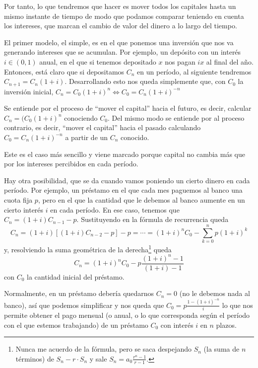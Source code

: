 \documentclass[nochap,palatino,shortheader]{apuntes}
\newcommand{\study}[1]{#1} \newcommand{\substudy}[1]{#1}
\begin{document}
Por tanto, lo que tendremos que hacer es mover todos los capitales hasta un mismo instante de tiempo de modo que podamos comparar teniendo en cuenta los intereses, que marcan el cambio de valor del dinero a lo largo del tiempo.

El primer modelo, el simple, es en el que ponemos una inversión que nos va generando intereses que se acumulan. Por ejemplo, un depósito con un interés $i ∈ (0,1)$ anual, en el que si tenemos depositado $x$ nos pagan $ix$ al final del año. Entonces, está claro que si depositamos $C_n$ en un período, al siguiente tendremos $C_{n+1} = C_n(1+i)$. Desarrollando esto nos queda simplemente que, con $C_0$ la inversión inicial, \( C_n = C_0 (1+i)^n \iff C_0 = C_n (1+i)^{-n} \label{eq:InteresCapFijo} \)

Se entiende por  el proceso de ``\study{mover el capital}'' hacia el futuro, es decir, calcular $C_n=(C_0(1+i)^n$ conociendo $C_0$. Del mismo modo se entiende por  al proceso contrario, es decir, ``mover el capital'' hacia el pasado calculando $C_0=C_n(1+i)^{-n}$ a partir de un $C_n$ conocido.

Este es el caso más sencillo y viene marcado porque capital no cambia más que por los intereses percibidos en cada período.

Hay otra posibilidad, que se da cuando vamos poniendo un cierto dinero en cada período. Por ejemplo, un préstamo en el que cada mes paguemos al banco una cuota fija $p$, pero en el que la cantidad que le debemos al banco aumente en un cierto interés $i$ en cada período. En ese caso, tenemos que $C_n = (1 + i) C_{n-1} - p$. Sustituyendo en la fórmula de recurrencia queda \[ C_n = (1 + i) \left[ (1+i) C_{n-2} - p\right] - p = \dotsb = (1+i)^nC_0 - \sum_{k = 0}^{n} p (1 + i)^k \] y, resolviendo la suma geométrica de la derecha\footnote{Nunca me acuerdo de la fórmula, pero se saca despejando $S_n$ (la suma de $n$ términos) de $S_n - r·S_n$ y sale $S_n = a_0 \frac{r^n - 1}{r-1}$.} queda \[ C_n = (1+i)^nC_0 - p\frac{(1+i)^{n} - 1}{(1+i) - 1}  \] con $C_0$ la cantidad inicial del préstamo.

Normalmente, en un préstamo debería quedarnos $C_n = 0$ (no le debemos nada al banco), así que podemos simplificar y nos queda que \( C_0 = p \frac{1 - (1 + i)^{-n}}{i} \label{eq:InteresCapVariable}\) lo que nos permite obtener el pago mensual (o anual, o lo que corresponda según el período con el que estemos trabajando) de un préstamo $C_0$ con interés $i$ en $n$ plazos.
\end{document}

